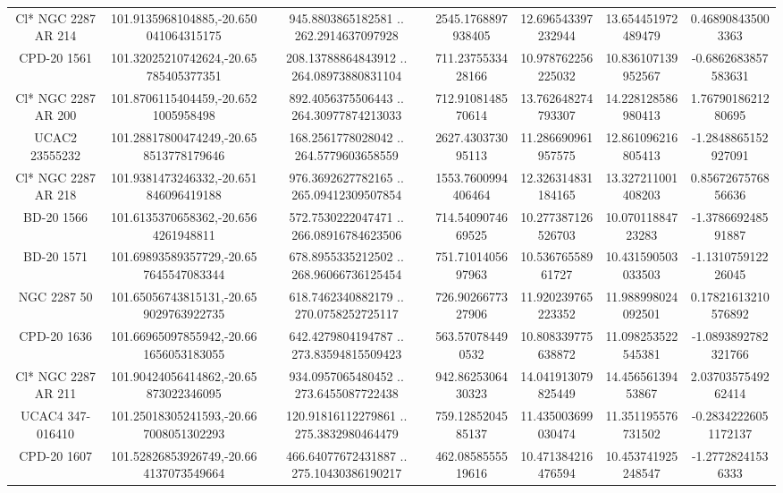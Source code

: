 \begin{table}
\begin{tabular}{ccccccc}
Cl* NGC 2287     AR     214 & 101.9135968104885,-20.650041064315175 & 945.8803865182581 .. 262.2914637097928 & 2545.1768897938405 & 12.696543397232944 & 13.654451972489479 & 0.468908435003363 \\
CPD-20  1561 & 101.32025210742624,-20.65785405377351 & 208.13788864843912 .. 264.08973880831104 & 711.2375533428166 & 10.978762256225032 & 10.836107139952567 & -0.6862683857583631 \\
Cl* NGC 2287     AR     200 & 101.8706115404459,-20.6521005958498 & 892.4056375506443 .. 264.30977874213033 & 712.9108148570614 & 13.762648274793307 & 14.228128586980413 & 1.7679018621280695 \\
UCAC2  23555232 & 101.28817800474249,-20.658513778179646 & 168.2561778028042 .. 264.5779603658559 & 2627.430373095113 & 11.286690961957575 & 12.861096216805413 & -1.2848865152927091 \\
Cl* NGC 2287     AR     218 & 101.9381473246332,-20.651846096419188 & 976.3692627782165 .. 265.09412309507854 & 1553.7600994406464 & 12.326314831184165 & 13.327211001408203 & 0.8567267576856636 \\
BD-20  1566 & 101.6135370658362,-20.6564261948811 & 572.7530222047471 .. 266.08916784623506 & 714.5409074669525 & 10.277387126526703 & 10.07011884723283 & -1.378669248591887 \\
BD-20  1571 & 101.69893589357729,-20.657645547083344 & 678.8955335212502 .. 268.96066736125454 & 751.7101405697963 & 10.53676558961727 & 10.431590503033503 & -1.131075912226045 \\
NGC  2287    50 & 101.65056743815131,-20.659029763922735 & 618.7462340882179 .. 270.0758252725117 & 726.9026677327906 & 11.920239765223352 & 11.988998024092501 & 0.17821613210576892 \\
CPD-20  1636 & 101.66965097855942,-20.661656053183055 & 642.4279804194787 .. 273.83594815509423 & 563.570784490532 & 10.808339775638872 & 11.098253522545381 & -1.0893892782321766 \\
Cl* NGC 2287     AR     211 & 101.90424056414862,-20.65873022346095 & 934.0957065480452 .. 273.6455087722438 & 942.8625306430323 & 14.041913079825449 & 14.45656139453867 & 2.0370357549262414 \\
UCAC4 347-016410 & 101.25018305241593,-20.667008051302293 & 120.91816112279861 .. 275.3832980464479 & 759.1285204585137 & 11.435003699030474 & 11.351195576731502 & -0.28342226051172137 \\
CPD-20  1607 & 101.52826853926749,-20.664137073549664 & 466.64077672431887 .. 275.10430386190217 & 462.0858555519616 & 10.471384216476594 & 10.453741925248547 & -1.27728241536333 \\

\end{tabular}
\end{table}
